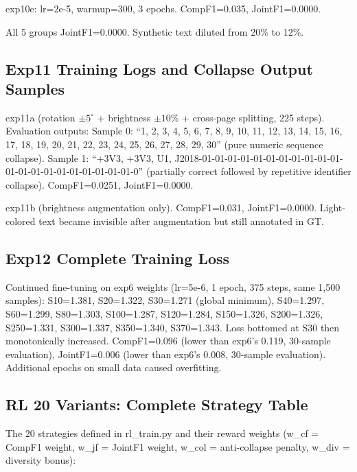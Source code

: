exp10e: lr=2e-5, warmup=300, 3 epochs. CompF1=0.035, JointF1=0.0000.

All 5 groups JointF1=0.0000. Synthetic text diluted from 20\% to 12\%.

\subsection{Exp11 Training Logs and Collapse Output Samples}

exp11a (rotation $\pm5^\circ$ + brightness $\pm10\%$ + cross-page splitting, 225 steps). Evaluation outputs:
Sample 0: ``1, 2, 3, 4, 5, 6, 7, 8, 9, 10, 11, 12, 13, 14, 15, 16, 17, 18, 19, 20, 21, 22, 23, 24, 25, 26, 27, 28, 29, 30'' (pure numeric sequence collapse).
Sample 1: ``+3V3, +3V3, U1, J2018-01-01-01-01-01-01-01-01-01-01-01-01-01-01-01-01-01-01-01-01-01-0'' (partially correct followed by repetitive identifier collapse).
CompF1=0.0251, JointF1=0.0000.

exp11b (brightness augmentation only). CompF1=0.031, JointF1=0.0000. Light-colored text became invisible after augmentation but still annotated in GT.

\subsection{Exp12 Complete Training Loss}

Continued fine-tuning on exp6 weights (lr=5e-6, 1 epoch, 375 steps, same 1,500 samples):
S10=1.381, S20=1.322, S30=1.271 (global minimum), S40=1.297, S60=1.299, S80=1.303, S100=1.287, S120=1.284, S150=1.326, S200=1.326, S250=1.331, S300=1.337, S350=1.340, S370=1.343.
Loss bottomed at S30 then monotonically increased. CompF1=0.096 (lower than exp6's 0.119, 30-sample evaluation), JointF1=0.006 (lower than exp6's 0.008, 30-sample evaluation). Additional epochs on small data caused overfitting.

\subsection{RL 20 Variants: Complete Strategy Table}

The 20 strategies defined in rl\_train.py and their reward weights (w\_cf = CompF1 weight, w\_jf = JointF1 weight, w\_col = anti-collapse penalty, w\_div = diversity bonus):

